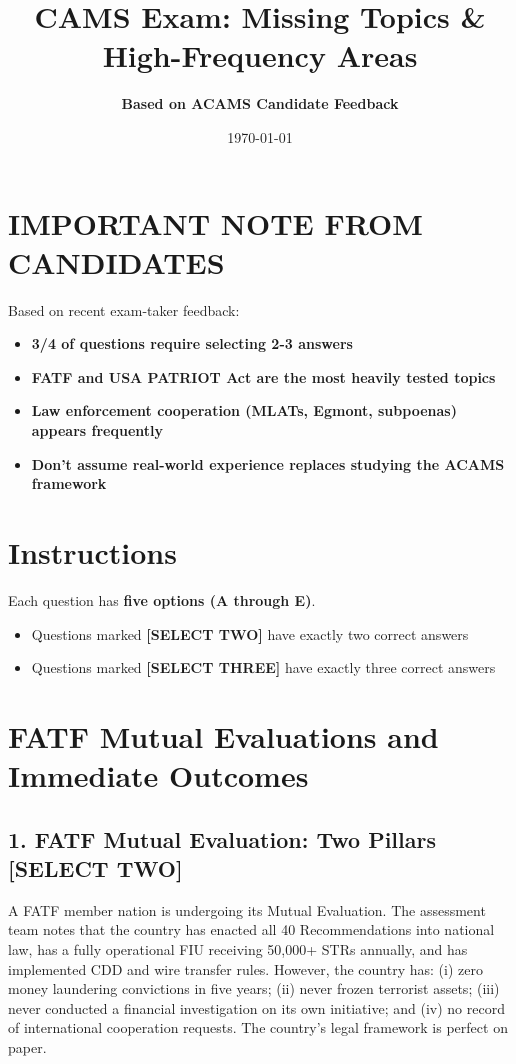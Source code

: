 \documentclass[11pt,a4paper]{article}
\title{\textbf{CAMS Exam: Missing Topics \& High-Frequency Areas}}
\author{\textbf{Based on ACAMS Candidate Feedback}}
\date{\today}
\begin{document}
	
	\maketitle
	
	\section*{IMPORTANT NOTE FROM CANDIDATES}
	Based on recent exam-taker feedback:
	\begin{itemize}
		\item \textbf{3/4 of questions require selecting 2-3 answers}
		\item \textbf{FATF and USA PATRIOT Act are the most heavily tested topics}
		\item \textbf{Law enforcement cooperation (MLATs, Egmont, subpoenas) appears frequently}
		\item \textbf{Don't assume real-world experience replaces studying the ACAMS framework}
	\end{itemize}
	
	\section*{Instructions}
	Each question has \textbf{five options (A through E)}. 
	\begin{itemize}
		\item Questions marked \textbf{[SELECT TWO]} have exactly two correct answers
		\item Questions marked \textbf{[SELECT THREE]} have exactly three correct answers
	\end{itemize}
	
	\newpage
	
	\section{FATF Mutual Evaluations and Immediate Outcomes}
	
	\subsection{1. FATF Mutual Evaluation: Two Pillars \textnormal{[SELECT TWO]}}
	
	A FATF member nation is undergoing its Mutual Evaluation. The assessment team notes that the country has enacted all 40 Recommendations into national law, has a fully operational FIU receiving 50,000+ STRs annually, and has implemented CDD and wire transfer rules. However, the country has: (i) zero money laundering convictions in five years; (ii) never frozen terrorist assets; (iii) never conducted a financial investigation on its own initiative; and (iv) no record of international cooperation requests. The country's legal framework is perfect on paper.
	
\end{document}
